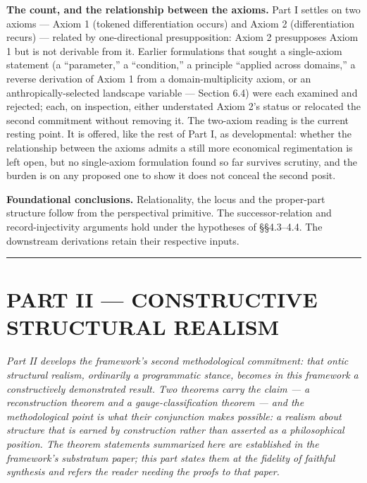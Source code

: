 \documentclass[
]{article}
\begin{document}
\textbf{The count, and the relationship between the axioms.} Part I
settles on two axioms --- Axiom 1 (tokened differentiation occurs) and
Axiom 2 (differentiation recurs) --- related by one-directional
presupposition: Axiom 2 presupposes Axiom 1 but is not derivable from
it. Earlier formulations that sought a single-axiom statement (a
``parameter,'' a ``condition,'' a principle ``applied across domains,''
a reverse derivation of Axiom 1 from a domain-multiplicity axiom, or an
anthropically-selected landscape variable --- Section 6.4) were each
examined and rejected; each, on inspection, either understated Axiom 2's
status or relocated the second commitment without removing it. The
two-axiom reading is the current resting point. It is offered, like the
rest of Part I, as developmental: whether the relationship between the
axioms admits a still more economical regimentation is left open, but no
single-axiom formulation found so far survives scrutiny, and the burden
is on any proposed one to show it does not conceal the second posit.

\textbf{Foundational conclusions.} Relationality, the locus and the
proper-part structure follow from the perspectival primitive. The
successor-relation and record-injectivity arguments hold under the
hypotheses of §§4.3--4.4. The downstream derivations retain their
respective inputs.

\begin{center}\rule{0.5\linewidth}{0.5pt}\end{center}

\hypertarget{part-ii-constructive-structural-realism}{%
\section{PART II --- CONSTRUCTIVE STRUCTURAL
REALISM}\label{part-ii-constructive-structural-realism}}

\emph{Part II develops the framework's second methodological commitment:
that ontic structural realism, ordinarily a programmatic stance, becomes
in this framework a constructively demonstrated result. Two theorems
carry the claim --- a reconstruction theorem and a gauge-classification
theorem --- and the methodological point is what their conjunction makes
possible: a realism about structure that is earned by construction
rather than asserted as a philosophical position. The theorem statements
summarized here are established in the framework's substratum paper;
this part states them at the fidelity of faithful synthesis and refers
the reader needing the proofs to that paper.}
\end{document}
